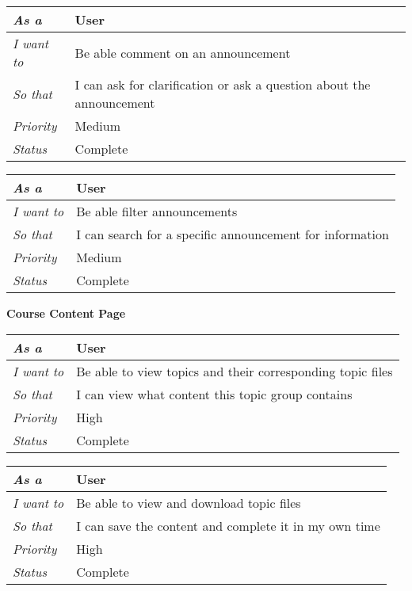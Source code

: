 \begin{table}[h!]
    \begin{tabular}{|l|l|}
        \hline
        \textit{As a} & User \\ \hline
        \textit{I want to} & Be able comment on an announcement \\ \hline
        \textit{So that} & I can ask for clarification or ask a question about the announcement \\ \hline
        \textit{Priority} & {\color[HTML]{FE996B} Medium} \\ \hline
        \textit{Status} & Complete \\ \hline
    \end{tabular}
\end{table}

\begin{table}[h!]
    \begin{tabular}{|l|l|}
        \hline
        \textit{As a} & User \\ \hline
        \textit{I want to} & Be able filter announcements \\ \hline
        \textit{So that} & I can search for a specific announcement for information\\ \hline
        \textit{Priority} & {\color[HTML]{FE996B} Medium} \\ \hline
        \textit{Status} & Complete \\ \hline
    \end{tabular}
\end{table}

\pagebreak
\FloatBarrier
\textbf{Course Content Page}
\FloatBarrier
\begin{table}[h!]
    \begin{tabular}{|l|l|}
        \hline
        \textit{As a} & User \\ \hline
        \textit{I want to} & Be able to view topics and their corresponding topic files \\ \hline
        \textit{So that} & I can view what content this topic group contains\\ \hline
        \textit{Priority} & {\color[HTML]{FE0000} High} \\ \hline
        \textit{Status} & Complete \\ \hline
    \end{tabular}
\end{table}

\begin{table}[h!]
    \begin{tabular}{|l|l|}
        \hline
        \textit{As a} & User \\ \hline
        \textit{I want to} & Be able to view and download topic files \\ \hline
        \textit{So that} & I can save the content and complete it in my own time\\ \hline
        \textit{Priority} & {\color[HTML]{FE0000} High} \\ \hline
        \textit{Status} & Complete \\ \hline
    \end{tabular}
\end{table}

